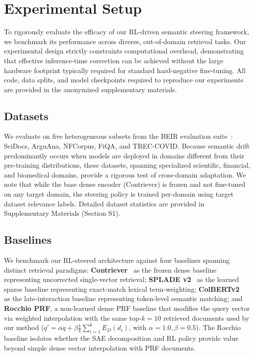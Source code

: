 \documentclass[sigconf]{acmart}
\begin{document}
\section{Experimental Setup}

To rigorously evaluate the efficacy of our RL-driven semantic steering framework, we benchmark its performance across diverse, out-of-domain retrieval tasks. Our experimental design strictly constraints computational overhead, demonstrating that effective inference-time correction can be achieved without the large hardware footprint typically required for standard hard-negative fine-tuning. All code, data splits, and model checkpoints required to reproduce our experiments are provided in the anonymized supplementary materials.

\subsection{Datasets}

We evaluate on five heterogeneous subsets from the BEIR evaluation suite~\cite{thakur2021}: SciDocs, ArguAna, NFCorpus, FiQA, and TREC-COVID. Because semantic drift predominantly occurs when models are deployed in domains different from their pre-training distributions, these datasets, spanning specialized scientific, financial, and biomedical domains, provide a rigorous test of cross-domain adaptation. We note that while the base dense encoder (Contriever) is frozen and not fine-tuned on any target domain, the steering policy is trained per-domain using target dataset relevance labels. Detailed dataset statistics are provided in Supplementary Materials (Section S1).

\subsection{Baselines}

We benchmark our RL-steered architecture against four baselines spanning distinct retrieval paradigms: \textbf{Contriever}~\cite{izacard2022} as the frozen dense baseline representing uncorrected single-vector retrieval; \textbf{SPLADE v2}~\cite{formal2021spladev2} as the learned sparse baseline representing exact-match lexical term-weighting; \textbf{ColBERTv2}~\cite{santhanam2022} as the late-interaction baseline representing token-level semantic matching; and \textbf{Rocchio PRF}, a non-learned dense PRF baseline that modifies the query vector via weighted interpolation with the same top-$k=10$ retrieved documents used by our method ($q' = \alpha q + \beta \frac{1}{k}\sum_{i=1}^{k} E_D(d_i)$, with $\alpha=1.0, \beta=0.5$). The Rocchio baseline isolates whether the SAE decomposition and RL policy provide value beyond simple dense vector interpolation with PRF documents.
\end{document}
